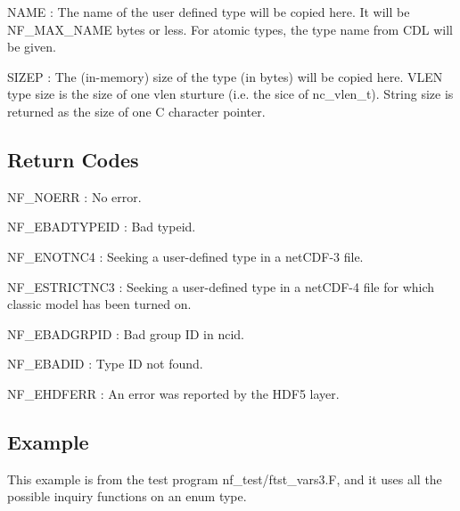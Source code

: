 {\ttfamily N\+A\+ME} \+: The name of the user defined type will be copied here. It will be N\+F\+\_\+\+M\+A\+X\+\_\+\+N\+A\+ME bytes or less. For atomic types, the type name from C\+DL will be given.

{\ttfamily S\+I\+Z\+EP} \+: The (in-\/memory) size of the type (in bytes) will be copied here. V\+L\+EN type size is the size of one vlen sturture (i.\+e. the sice of nc\+\_\+vlen\+\_\+t). String size is returned as the size of one C character pointer.

\subsection*{Return Codes }

{\ttfamily N\+F\+\_\+\+N\+O\+E\+RR} \+: No error.

{\ttfamily N\+F\+\_\+\+E\+B\+A\+D\+T\+Y\+P\+E\+ID} \+: Bad typeid.

{\ttfamily N\+F\+\_\+\+E\+N\+O\+T\+N\+C4} \+: Seeking a user-\/defined type in a net\+C\+D\+F-\/3 file.

{\ttfamily N\+F\+\_\+\+E\+S\+T\+R\+I\+C\+T\+N\+C3} \+: Seeking a user-\/defined type in a net\+C\+D\+F-\/4 file for which classic model has been turned on.

{\ttfamily N\+F\+\_\+\+E\+B\+A\+D\+G\+R\+P\+ID} \+: Bad group ID in ncid.

{\ttfamily N\+F\+\_\+\+E\+B\+A\+D\+ID} \+: Type ID not found.

{\ttfamily N\+F\+\_\+\+E\+H\+D\+F\+E\+RR} \+: An error was reported by the H\+D\+F5 layer.

\subsection*{Example }

This example is from the test program nf\+\_\+test/ftst\+\_\+vars3.\+F, and it uses all the possible inquiry functions on an enum type.

 

